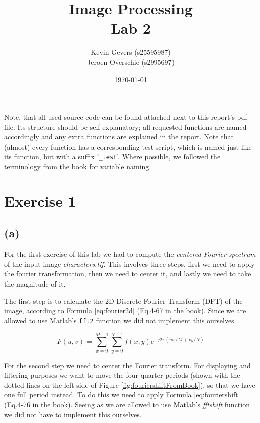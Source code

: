 \documentclass{article}
\title{Image Processing\\
    Lab 2}
\author{Kevin Gevers (s25595987) \\ Jeroen Overschie (s2995697)}
\date{\today}
\begin{document}
\maketitle

Note, that all used source code can be found attached next to this report's pdf file. Its structure should be self-explanatory; all requested functions are named accordingly and any extra functions are explained in the report. Note that (almost) every function has a corresponding test script, which is named just like its function, but with a suffix '\texttt{\_test}'. Where possible, we followed the terminology from the book \citep{gonzalez2008digital} for variable naming.

\section*{Exercise 1}
\subsection*{(a)}
For the first exercise of this lab we had to compute the \textit{centered Fourier spectrum} of the input image \textit{characters.tif}. This involves three steps, first we need to apply the fourier transformation, then we need to center it, and lastly we need to take the magnitude of it. 

The first step is to calculate the 2D Discrete Fourier Transform (DFT) of the image, according to Formula \ref{eq:fourier2d} (Eq.4-67 in the book). Since we are allowed to use Matlab's \texttt{fft2} function we did not implement this ourselves.

\begin{equation}\label{eq:fourier2d}
    F(u, v)=\sum_{x=0}^{M-1} \sum_{y=0}^{N-1} f(x, y) e^{-j 2 \pi(u x / M+v y / N)}
\end{equation}

For the second step we need to center the Fourier transform. For displaying and filtering purposes we want to move the four quarter periods (shown with the dotted lines on the left side of Figure \ref{fig:fouriershiftFromBook}), so that we have one full period instead. To do this we need to apply Formula \ref{eq:fouriershift} (Eq.4-76 in the book). Seeing as we are allowed to use Matlab's \textit{fftshift} function we did not have to implement this ourselves.
\end{document}
